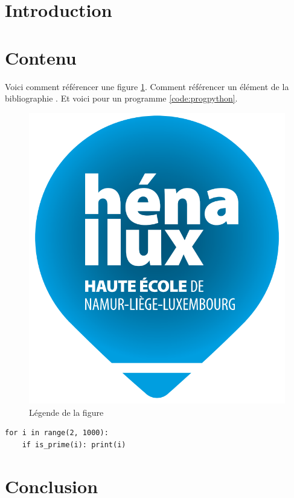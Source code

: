 \documentclass[a4paper]{article}
\newenvironment{code}{\captionsetup{type=listing}}{}
\begin{document}
\let\cleardoublepage\clearpage










\section{Introduction}













\section{Contenu}



Voici comment référencer une figure \ref{fig:figurename}. Comment référencer un élément de la bibliographie \cite{1}. Et voici pour un programme \ref{code:progpython}.

\begin{figure}[H]
    \centering
    \includegraphics[width=0.3\linewidth]{images/LogoHenallux.PNG}
    \caption{Légende de la figure}
    \label{fig:figurename}
\end{figure}

\begin{code}\small
\begin{verbatim}
for i in range(2, 1000):
    if is_prime(i): print(i)
\end{verbatim}
\caption{Affichage des nombres premiers entre 0 et 1000}
\label{code:progpython}
\end{code}










\section{Conclusion}
\end{document}
